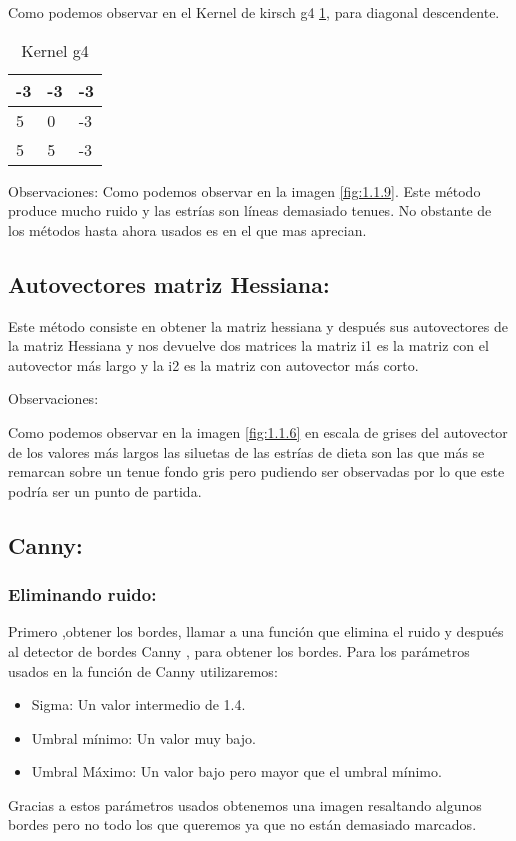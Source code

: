 Como podemos observar en el Kernel de kirsch g4 \ref{F_k6_4}, para diagonal descendente.

\begin{table}[]
	\centering
	\caption{Kernel g4}
	\label{F_k6_4}
	\begin{tabular}{|l|l|l|}
		\hline
		-3  & -3 & -3  \\ \hline
		5 & 0  & -3 \\ \hline
		5 & 5 & -3 \\ \hline
	\end{tabular}
\end{table}
Observaciones:
Como podemos observar en la imagen \ref{fig:1.1.9}.
Este método produce mucho ruido y las estrías son líneas demasiado tenues.
No obstante de los métodos hasta ahora usados es en el que mas aprecian.

\subsection{Autovectores matriz Hessiana:}
Este método consiste en obtener la matriz hessiana \cite{wiki:Hessiana} y después sus autovectores de la matriz Hessiana y nos devuelve dos matrices la matriz i1 es la matriz con el autovector más largo y la i2 es la matriz con autovector más corto.



Observaciones: 

Como podemos observar en la imagen \ref{fig:1.1.6} en escala de grises del autovector de los valores más largos las siluetas de las estrías de dieta son las que más se remarcan sobre un tenue fondo gris pero pudiendo ser observadas por lo que este podría ser un punto de partida.



\subsection{Canny:}

\subsubsection{Eliminando ruido:}
Primero ,obtener los bordes, llamar a una función que elimina el ruido y después al detector de bordes Canny \cite{wiki:Canny}, para obtener los bordes.
Para los parámetros usados en la función de Canny utilizaremos:
\begin{itemize}
	\item Sigma: Un valor intermedio de 1.4.
	\item Umbral mínimo: Un valor muy bajo.
	\item Umbral Máximo: Un valor bajo pero mayor que el umbral mínimo.
\end{itemize}
Gracias a estos parámetros usados obtenemos una imagen resaltando algunos bordes pero no todo los que queremos ya que no están demasiado marcados.




